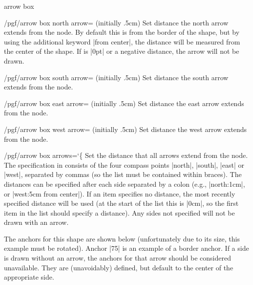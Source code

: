 \begin{shape}{arrow box}
\begin{key}{/pgf/arrow box north arrow= (initially .5cm)}
  Set distance the north arrow extends from the node. By default this
  is from the border of the shape, but by using the additional keyword
  |from center|, the distance will be measured from the center of the
  shape. If  is |0pt| or a negative distance, the arrow
  will not be drawn.
\end{key}

\begin{key}{/pgf/arrow box south arrow= (initially .5cm)}
	Set distance the south arrow extends from the node.
\end{key}

\begin{key}{/pgf/arrow box east arrow= (initially .5cm)}
	Set distance the east arrow extends from the node.
\end{key}

\begin{key}{/pgf/arrow box west arrow= (initially .5cm)}
	Set distance the west arrow extends from the node.
\end{key}

\begin{key}{/pgf/arrow box arrows={\ttfamily\char`\{}}
  Set the distance that all arrows extend from the node. The
  specification in  consists of the four compass points
  |north|, |south|, |east| or |west|, separated by commas (so the list
  must be contained within braces).
  The distances can be specified after each side separated by a colon
  (e.g., |north:1cm|, or |west:5cm from center|).
  If an item specifies no distance, the most recently specified
  distance will be used (at the start of the list this is |0cm|,
  so the first item in the list should specify a distance).
  Any sides not specified will not be drawn with an arrow.
\end{key}

The anchors for this shape are shown below (unfortunately due to its
size, this example must be rotated). Anchor |75| is an example of a
border anchor.
If a side is drawn without an arrow, the anchors for that arrow should
be considered unavailable. They are (unavoidably) defined, but default
to the center of the appropriate side.


\end{shape}
